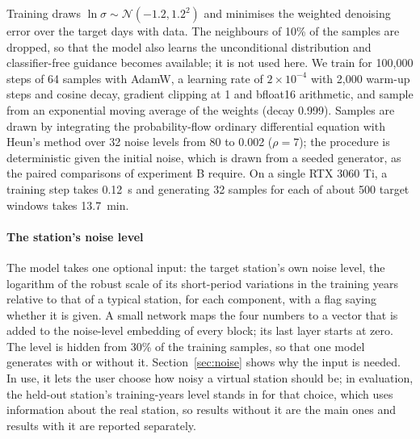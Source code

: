 \documentclass[preprint,12pt,authoryear]{elsarticle}
\begin{document}
Training draws $\ln\sigma \sim \mathcal{N}(-1.2, 1.2^2)$ and minimises the weighted
denoising error over the target days with data. The neighbours of 10\% of the samples are
dropped, so that the model also learns the unconditional distribution and classifier-free
guidance \citep{ho2022cfg} becomes available; it is not used here. We train for 100,000
steps of 64 samples with AdamW, a learning rate of $2 \times 10^{-4}$ with 2,000 warm-up
steps and cosine decay, gradient clipping at 1 and bfloat16 arithmetic, and sample from
an exponential moving average of the weights (decay 0.999). Samples are drawn by
integrating the probability-flow ordinary differential equation with Heun's method over
32 noise levels from 80 to 0.002 ($\rho = 7$); the procedure is deterministic given the
initial noise, which is drawn from a seeded generator, as the paired comparisons of
experiment B require. On a single RTX 3060 Ti, a training step takes 0.12~s and
generating 32 samples for each of about 500 target windows takes 13.7~min.

\paragraph{The station's noise level} The model takes one optional input: the target
station's own noise level, the logarithm of the robust scale of its short-period
variations in the training years relative to that of a typical station, for each
component, with a flag saying whether it is given. A small network maps the four numbers
to a vector that is added to the noise-level embedding of every block; its last layer
starts at zero. The level is hidden from 30\% of the training samples, so that one model
generates with or without it. Section~\ref{sec:noise} shows why the input is needed. In
use, it lets the user choose how noisy a virtual station should be; in evaluation, the
held-out station's training-years level stands in for that choice, which uses information
about the real station, so results without it are the main ones and results with it are
reported separately.
\end{document}

